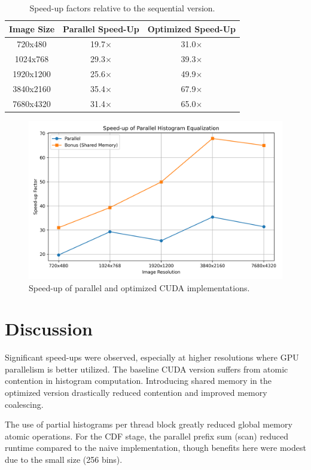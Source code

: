 \documentclass[9pt]{IEEEtran}
\begin{document}
\begin{table}[H]
\centering
\begin{tabular}{|c|c|c|}
\hline
Image Size & Parallel Speed-Up & Optimized Speed-Up \\ \hline
720x480   & 19.7\(\times\)   & 31.0\(\times\) \\ \hline
1024x768  & 29.3\(\times\)   & 39.3\(\times\) \\ \hline
1920x1200 & 25.6\(\times\)   & 49.9\(\times\) \\ \hline
3840x2160 & 35.4\(\times\)   & 67.9\(\times\) \\ \hline
7680x4320 & 31.4\(\times\)   & 65.0\(\times\) \\ \hline
\end{tabular}
\caption{Speed-up factors relative to the sequential version.}
\label{tab:speedups}
\end{table}

\begin{figure}[H]
    \centering
    \includegraphics[width=0.9\columnwidth]{speedup.png}
    \caption{Speed-up of parallel and optimized CUDA implementations.}
    \label{fig:speedup}
\end{figure}

\section{Discussion}
Significant speed-ups were observed, especially at higher resolutions where GPU parallelism is better utilized. The baseline CUDA version suffers from atomic contention in histogram computation. Introducing shared memory in the optimized version drastically reduced contention and improved memory coalescing.

The use of partial histograms per thread block greatly reduced global memory atomic operations. For the CDF stage, the parallel prefix sum (scan) reduced runtime compared to the naive implementation, though benefits here were modest due to the small size (256 bins).
\end{document}
